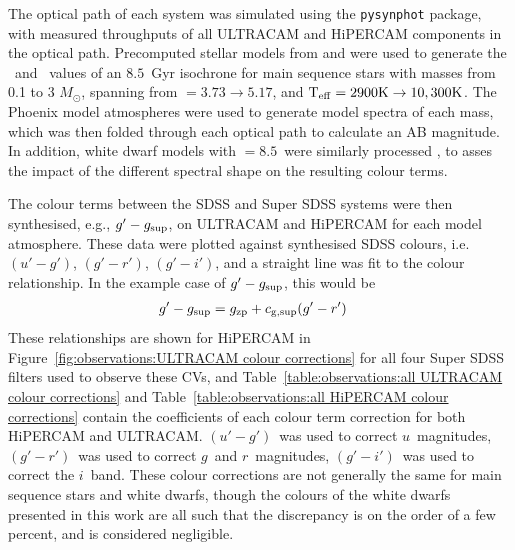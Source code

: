 The optical path of each system was simulated using the \texttt{pysynphot} package, with measured throughputs of all ULTRACAM and HiPERCAM components in the optical path. Precomputed stellar models from \citet{Dotter2016} and \citet{Choi2016} were used to generate the \teff\ and \logg\ values of an $8.5$\ Gyr isochrone for main sequence stars with masses from 0.1 to 3 $M_\odot$, spanning from \logg $= 3.73 \to 5.17$, and $\rm{T_{eff}} = 2900K \to 10,300K$. The Phoenix model atmospheres \citep{allard2012} were used to generate model spectra of each mass, which was then folded through each optical path to calculate an AB magnitude. In addition, white dwarf models with \logg$=8.5$\ were similarly processed \citep{koester2010, tremblay2009}, to asses the impact of the different spectral shape on the resulting colour terms.

The colour terms between the SDSS and Super SDSS systems were then synthesised, e.g., $g'-g_{\rm sup}$, on ULTRACAM and HiPERCAM for each model atmosphere. These data were plotted against synthesised SDSS colours, i.e. $(u'-g')$, $(g'-r')$, $(g'-i')$, and a straight line was fit to the colour relationship. In the example case of $g'-g_{\rm sup}$, this would be
\begin{align*}
    g' - g_{\rm sup} &= g_{\rm zp} + c_{\rm g, sup}(g'-r')
\end{align*}
These relationships are shown for HiPERCAM in Figure~\ref{fig:observations:ULTRACAM colour corrections} for all four Super SDSS filters used to observe these CVs, and Table~\ref{table:observations:all ULTRACAM colour corrections} and Table~\ref{table:observations:all HiPERCAM colour corrections} contain the coefficients of each colour term correction for both HiPERCAM and ULTRACAM.
$(u'-g')$\ was used to correct $u$\ magnitudes, $(g'-r')$\ was used to correct $g$\ and $r$\ magnitudes, $(g'-i')$\ was used to correct the $i$\ band.
These colour corrections are not generally the same for main sequence stars and white dwarfs, though the colours of the white dwarfs presented in this work are all such that the discrepancy is on the order of a few percent, and is considered negligible.

